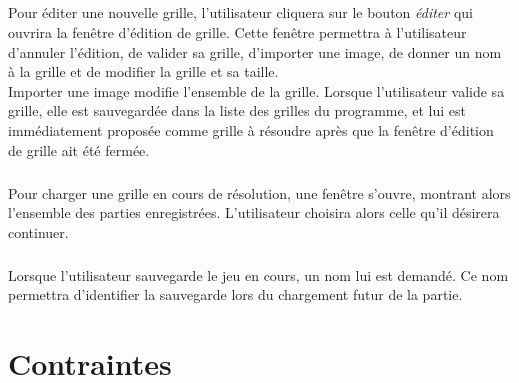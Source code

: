         \paragraph*{}
        Pour éditer une nouvelle grille, l'utilisateur cliquera sur le bouton \textit{éditer} qui ouvrira la fenêtre d'édition de grille.
        Cette fenêtre permettra à l'utilisateur d'annuler l'édition, de valider sa grille, d'importer une image, de donner un nom à la grille et de modifier la grille et sa taille.\\
        Importer une image modifie l'ensemble de la grille.
        Lorsque l'utilisateur valide sa grille, elle est sauvegardée dans la liste des grilles du programme, et lui est immédiatement proposée comme grille à résoudre après que la fenêtre d'édition de grille ait été fermée.\\
        \paragraph*{}
        Pour charger une grille en cours de résolution, une fenêtre s'ouvre, montrant alors l'ensemble des parties enregistrées. L'utilisateur choisira alors celle qu'il désirera continuer.
        \paragraph*{}
        Lorsque l'utilisateur sauvegarde le jeu en cours, un nom lui est demandé. Ce nom permettra d'identifier la sauvegarde lors du chargement futur de la partie.




\chapter{Contraintes}


